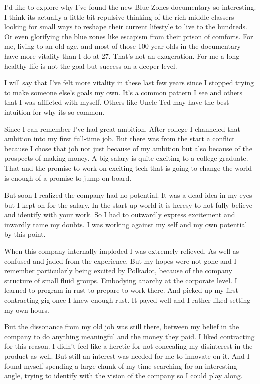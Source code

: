 I'd like to explore why I've found the new Blue Zones documentary so interesting. I think its actually a little bit repulsive thinking of the rich middle-classers looking for small ways to reshape their current lifestyle to live to the hundreds. Or even glorifying the blue zones like escapism from their prison of comforts. For me, living to an old age, and most of those 100 year olds in the documentary have more vitality than I do at 27. That's not an exageration. For me a long healthy life is not the goal but success on a deeper level.

I will say that I've felt more vitality in these last few years since I stopped trying to make someone else's goals my own. It's a common pattern I see and others that I was afflicted with myself. Others like Uncle Ted may have the best intuition for why its so common.

Since I can remember I've had great ambition. After college I channeled that ambition into my first full-time job. But there was from the start a conflict because I chose that job not just because of my ambition but also because of the prospects of making money. A big salary is quite exciting to a college graduate. That and the promise to work on exciting tech that is going to change the world is enough of a promise to jump on board.

But soon I realized the company had no potential. It was a dead idea in my eyes but I kept on for the salary. In the start up world it is heresy to not fully believe and identify with your work. So I had to outwardly express excitement and inwardly tame my doubts. I was working against my self and my own potential by this point.

When this company internally imploded I was extremely relieved. As well as confused and jaded from the experience. But my hopes were not gone and I remember particularly being excited by Polkadot, because of the company structure of small fluid groups. Embodying anarchy at the corporate level. I learned to program in rust to prepare to work there. And picked up my first contracting gig once I knew enough rust. It payed well and I rather liked setting my own hours.

But the dissonance from my old job was still there, between my belief in the company to do anything meaningful and the money they paid. I liked contracting for this reason. I didn't feel like a heretic for not concealing my disinterest in the product as well. But still an interest was needed for me to innovate on it. And I found myself spending a large chunk of my time searching for an interesting angle, trying to identify with the vision of the company so I could play along.

